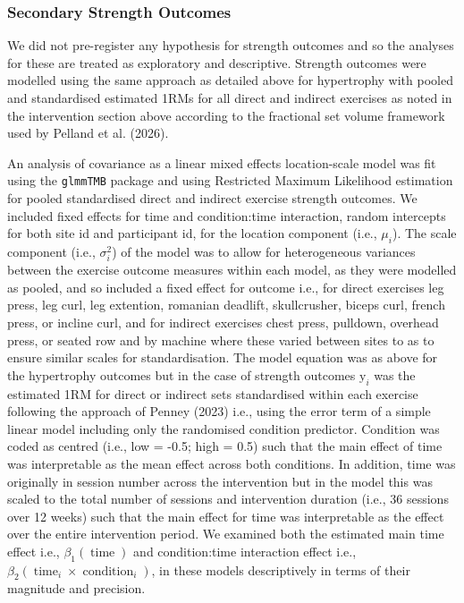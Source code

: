 \documentclass[
]{article}
\begin{document}
\subsubsection{Secondary Strength
Outcomes}\label{secondary-strength-outcomes}

We did not pre-register any hypothesis for strength outcomes and so the
analyses for these are treated as exploratory and descriptive. Strength
outcomes were modelled using the same approach as detailed above for
hypertrophy with pooled and standardised estimated 1RMs for all direct
and indirect exercises as noted in the intervention section above
according to the fractional set volume framework used by Pelland et al.
(2026).

An analysis of covariance as a linear mixed effects location-scale model
was fit using the \texttt{glmmTMB} package and using Restricted Maximum
Likelihood estimation for pooled standardised direct and indirect
exercise strength outcomes. We included fixed effects for time and
condition:time interaction, random intercepts for both site id and
participant id, for the location component (i.e., \(\mu_i\)). The scale
component (i.e., \(\sigma_{i}^2\)) of the model was to allow for
heterogeneous variances between the exercise outcome measures within
each model, as they were modelled as pooled, and so included a fixed
effect for outcome i.e., for direct exercises leg press, leg curl, leg
extention, romanian deadlift, skullcrusher, biceps curl, french press,
or incline curl, and for indirect exercises chest press, pulldown,
overhead press, or seated row and by machine where these varied between
sites to as to ensure similar scales for standardisation. The model
equation was as above for the hypertrophy outcomes but in the case of
strength outcomes \(\textrm{y}_{i}\) was the estimated 1RM for direct or
indirect sets standardised within each exercise following the approach
of Penney (2023) i.e., using the error term of a simple linear model
including only the randomised condition predictor. Condition was coded
as centred (i.e., low = -0.5; high = 0.5) such that the main effect of
time was interpretable as the mean effect across both conditions. In
addition, time was originally in session number across the intervention
but in the model this was scaled to the total number of sessions and
intervention duration (i.e., 36 sessions over 12 weeks) such that the
main effect for time was interpretable as the effect over the entire
intervention period. We examined both the estimated main time effect
i.e., \(\beta_{1}(\operatorname{time})\) and condition:time interaction
effect i.e.,
\(\beta_{2}(\operatorname{time}_i \times \operatorname{condition}_i)\),
in these models descriptively in terms of their magnitude and precision.
\end{document}
